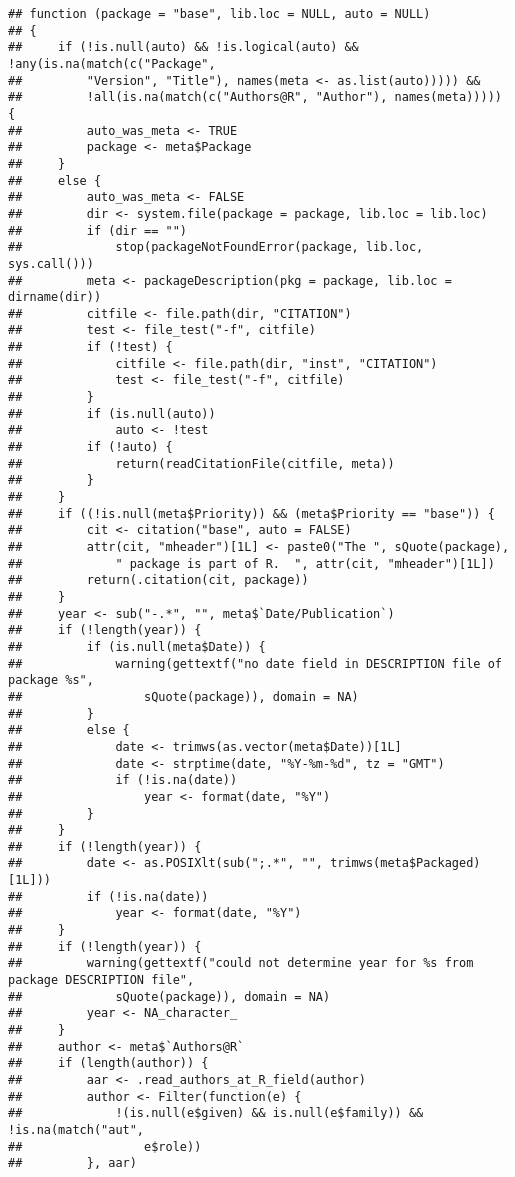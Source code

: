 \documentclass[]{book}
\begin{document}
\begin{verbatim}
## function (package = "base", lib.loc = NULL, auto = NULL) 
## {
##     if (!is.null(auto) && !is.logical(auto) && !any(is.na(match(c("Package", 
##         "Version", "Title"), names(meta <- as.list(auto))))) && 
##         !all(is.na(match(c("Authors@R", "Author"), names(meta))))) {
##         auto_was_meta <- TRUE
##         package <- meta$Package
##     }
##     else {
##         auto_was_meta <- FALSE
##         dir <- system.file(package = package, lib.loc = lib.loc)
##         if (dir == "") 
##             stop(packageNotFoundError(package, lib.loc, sys.call()))
##         meta <- packageDescription(pkg = package, lib.loc = dirname(dir))
##         citfile <- file.path(dir, "CITATION")
##         test <- file_test("-f", citfile)
##         if (!test) {
##             citfile <- file.path(dir, "inst", "CITATION")
##             test <- file_test("-f", citfile)
##         }
##         if (is.null(auto)) 
##             auto <- !test
##         if (!auto) {
##             return(readCitationFile(citfile, meta))
##         }
##     }
##     if ((!is.null(meta$Priority)) && (meta$Priority == "base")) {
##         cit <- citation("base", auto = FALSE)
##         attr(cit, "mheader")[1L] <- paste0("The ", sQuote(package), 
##             " package is part of R.  ", attr(cit, "mheader")[1L])
##         return(.citation(cit, package))
##     }
##     year <- sub("-.*", "", meta$`Date/Publication`)
##     if (!length(year)) {
##         if (is.null(meta$Date)) {
##             warning(gettextf("no date field in DESCRIPTION file of package %s", 
##                 sQuote(package)), domain = NA)
##         }
##         else {
##             date <- trimws(as.vector(meta$Date))[1L]
##             date <- strptime(date, "%Y-%m-%d", tz = "GMT")
##             if (!is.na(date)) 
##                 year <- format(date, "%Y")
##         }
##     }
##     if (!length(year)) {
##         date <- as.POSIXlt(sub(";.*", "", trimws(meta$Packaged)[1L]))
##         if (!is.na(date)) 
##             year <- format(date, "%Y")
##     }
##     if (!length(year)) {
##         warning(gettextf("could not determine year for %s from package DESCRIPTION file", 
##             sQuote(package)), domain = NA)
##         year <- NA_character_
##     }
##     author <- meta$`Authors@R`
##     if (length(author)) {
##         aar <- .read_authors_at_R_field(author)
##         author <- Filter(function(e) {
##             !(is.null(e$given) && is.null(e$family)) && !is.na(match("aut", 
##                 e$role))
##         }, aar)

\end{verbatim}
\end{document}
